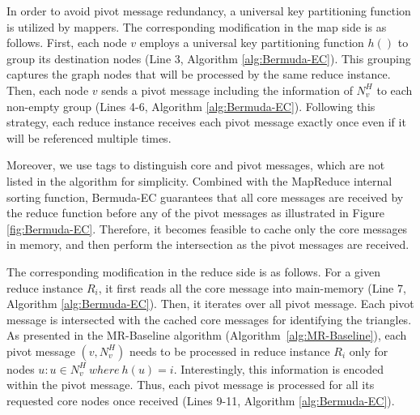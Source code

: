 In order to avoid pivot message redundancy, a universal key partitioning function is utilized by mappers. 
The corresponding modification in the map side is as follows. First, each node $v$ employs a universal key partitioning function $h()$ to group its destination nodes 
(Line 3, Algorithm \ref{alg:Bermuda-EC}). This grouping captures the graph nodes that will be processed by the same reduce instance. 
Then, each node $v$ sends a pivot message including the information of $N_v^H$ to each non-empty group (Lines 4-6, Algorithm \ref{alg:Bermuda-EC}). 
Following this strategy, each reduce instance receives each pivot message exactly once even if it will be referenced multiple times. 

Moreover, we use tags to distinguish core and pivot messages, which are not listed in the algorithm for simplicity.  
Combined with the MapReduce internal sorting function, Bermuda-EC guarantees that all core messages are received by the reduce function before any of the pivot messages 
as illustrated in Figure \ref{fig:Bermuda-EC}. 
Therefore, it becomes feasible to cache only the core messages in memory, and then perform the intersection as the 
pivot messages are received.

The corresponding modification in the reduce side is as follows. For a given reduce instance $R_i$, it first reads all the core message into main-memory (Line 7, Algorithm \ref{alg:Bermuda-EC}). Then, it iterates over all pivot message. Each pivot message is  intersected with the cached core messages for identifying the triangles. 
As presented in the MR-Baseline algorithm (Algorithm~\ref{alg:MR-Baseline}), each pivot message $(v,N_v^H)$ needs to be processed in reduce instance $R_i$ only for 
nodes ${u: u \in N_v^H ~ where~ h(u)=i}$. Interestingly, this information is  encoded within the pivot message. Thus, each pivot message is processed for all its requested core nodes once received 
(Lines 9-11, Algorithm \ref{alg:Bermuda-EC}). 
%

